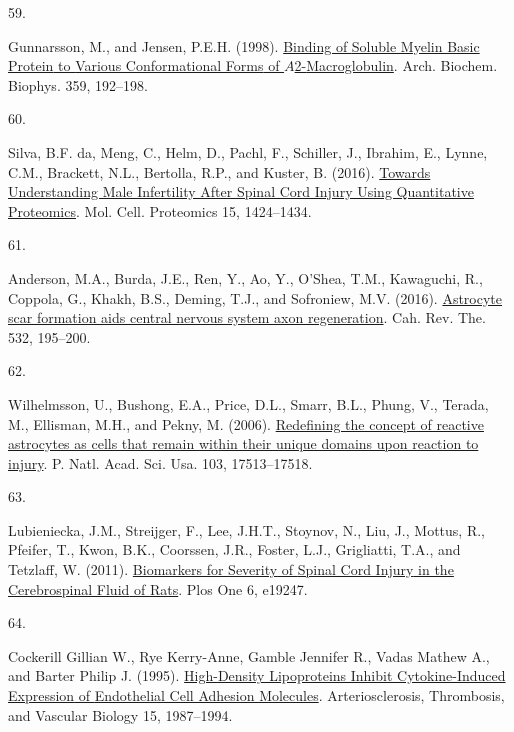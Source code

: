 \documentclass[
]{article}
\newlength{\cslhangindent}
\newlength{\csllabelwidth}
\newlength{\cslentryspacingunit} %
\newenvironment{CSLReferences}[2] %
 {%
  \setlength{\parindent}{0pt}
  \ifodd #1
  \let\oldpar\par
  \def\par{\hangindent=\cslhangindent\oldpar}
  \fi
  \setlength{\parskip}{#2\cslentryspacingunit}
 }%
 {}
\newcommand{\CSLLeftMargin}[1]{\parbox[t]{\csllabelwidth}{#1}}
\newcommand{\CSLRightInline}[1]{\parbox[t]{\linewidth - \csllabelwidth}{#1}\break}
\begin{document}
\begin{CSLReferences}{0}{0}
\leavevmode{}%
\CSLLeftMargin{59. }
\CSLRightInline{Gunnarsson, M., and Jensen, P.E.H. (1998). \href{https://doi.org/10.1006/abbi.1998.0902}{Binding of {Soluble Myelin Basic Protein} to {Various Conformational Forms} of {\(A\)}2-{Macroglobulin}}. Arch. Biochem. Biophys. 359, 192--198.}

\leavevmode{}%
\CSLLeftMargin{60. }
\CSLRightInline{Silva, B.F. da, Meng, C., Helm, D., Pachl, F., Schiller, J., Ibrahim, E., Lynne, C.M., Brackett, N.L., Bertolla, R.P., and Kuster, B. (2016). \href{https://doi.org/10.1074/mcp.M115.052175}{Towards {Understanding Male Infertility After Spinal Cord Injury Using Quantitative Proteomics}}. Mol. Cell. Proteomics 15, 1424--1434.}

\leavevmode{}%
\CSLLeftMargin{61. }
\CSLRightInline{Anderson, M.A., Burda, J.E., Ren, Y., Ao, Y., O'Shea, T.M., Kawaguchi, R., Coppola, G., Khakh, B.S., Deming, T.J., and Sofroniew, M.V. (2016). \href{https://doi.org/10.1038/nature17623}{Astrocyte scar formation aids central nervous system axon regeneration}. Cah. Rev. The. 532, 195--200.}

\leavevmode{}%
\CSLLeftMargin{62. }
\CSLRightInline{Wilhelmsson, U., Bushong, E.A., Price, D.L., Smarr, B.L., Phung, V., Terada, M., Ellisman, M.H., and Pekny, M. (2006). \href{https://doi.org/10.1073/pnas.0602841103}{Redefining the concept of reactive astrocytes as cells that remain within their unique domains upon reaction to injury}. P. Natl. Acad. Sci. Usa. 103, 17513--17518.}

\leavevmode{}%
\CSLLeftMargin{63. }
\CSLRightInline{Lubieniecka, J.M., Streijger, F., Lee, J.H.T., Stoynov, N., Liu, J., Mottus, R., Pfeifer, T., Kwon, B.K., Coorssen, J.R., Foster, L.J., Grigliatti, T.A., and Tetzlaff, W. (2011). \href{https://doi.org/10.1371/journal.pone.0019247}{Biomarkers for {Severity} of {Spinal Cord Injury} in the {Cerebrospinal Fluid} of {Rats}}. Plos One 6, e19247.}

\leavevmode{}%
\CSLLeftMargin{64. }
\CSLRightInline{Cockerill Gillian W., Rye Kerry-Anne, Gamble Jennifer R., Vadas Mathew A., and Barter Philip J. (1995). \href{https://doi.org/10.1161/01.ATV.15.11.1987}{High-{Density Lipoproteins Inhibit Cytokine-Induced Expression} of {Endothelial Cell Adhesion Molecules}}. Arteriosclerosis, Thrombosis, and Vascular Biology 15, 1987--1994.}


\end{CSLReferences}
\end{document}
